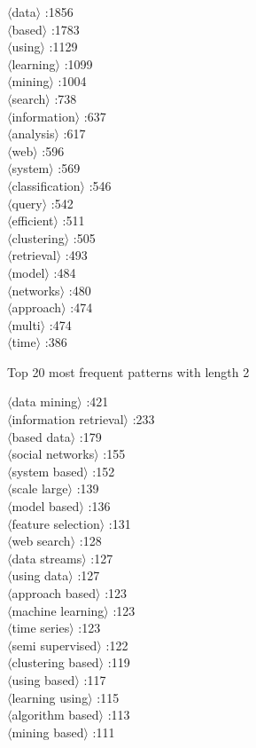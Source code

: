 \documentclass[11pt,a4paper,fleqn]{article}
\begin{document}
\begin{multicols}{4} \noindent 
$\langle$data$\rangle$ :1856\\
$\langle$based$\rangle$ :1783\\
$\langle$using$\rangle$ :1129\\
$\langle$learning$\rangle$ :1099\\
$\langle$mining$\rangle$ :1004\\
$\langle$search$\rangle$ :738\\
$\langle$information$\rangle$ :637\\
$\langle$analysis$\rangle$ :617\\
$\langle$web$\rangle$ :596\\
$\langle$system$\rangle$ :569\\
$\langle$classification$\rangle$ :546\\
$\langle$query$\rangle$ :542\\
$\langle$efficient$\rangle$ :511\\
$\langle$clustering$\rangle$ :505\\
$\langle$retrieval$\rangle$ :493\\
$\langle$model$\rangle$ :484\\
$\langle$networks$\rangle$ :480\\
$\langle$approach$\rangle$ :474\\
$\langle$multi$\rangle$ :474\\
$\langle$time$\rangle$ :386\\
\end{multicols} \noindent
Top 20 most frequent patterns with length 2
\begin{multicols}{3} \noindent
$\langle$data mining$\rangle$ :421\\
$\langle$information retrieval$\rangle$ :233\\
$\langle$based data$\rangle$ :179\\
$\langle$social networks$\rangle$ :155\\
$\langle$system based$\rangle$ :152\\
$\langle$scale large$\rangle$ :139\\
$\langle$model based$\rangle$ :136\\
$\langle$feature selection$\rangle$ :131\\
$\langle$web search$\rangle$ :128\\
$\langle$data streams$\rangle$ :127\\
$\langle$using data$\rangle$ :127\\
$\langle$approach based$\rangle$ :123\\
$\langle$machine learning$\rangle$ :123\\
$\langle$time series$\rangle$ :123\\
$\langle$semi supervised$\rangle$ :122\\
$\langle$clustering based$\rangle$ :119\\
$\langle$using based$\rangle$ :117\\
$\langle$learning using$\rangle$ :115\\
$\langle$algorithm based$\rangle$ :113\\
$\langle$mining based$\rangle$ :111\\
\end{multicols} \noindent
\end{document}
